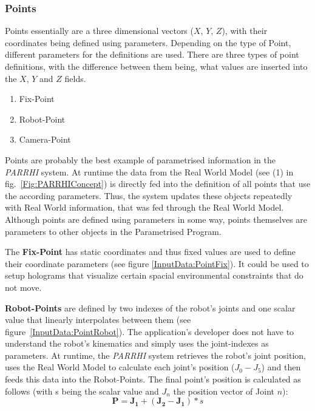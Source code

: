 \subsubsection{Points}\label{Section:Points}
 
Points essentially are a three dimensional vectors ($X$, $Y$, $Z$), with their coordinates being defined using parameters. Depending on the type of Point, different parameters for the definitions are used. There are three types of point definitions, with the difference between them being, what values are inserted into the $X$, $Y$ and $Z$ fields.
\begin{enumerate}
	\setlength\itemsep{-1em}
	\item Fix-Point
	\item Robot-Point
	\item Camera-Point
\end{enumerate}

Points are probably the best example of parametrised information in the \textit{PARRHI} system. At runtime the data from the Real World Model (see (1) in fig.~\ref{Fig:PARRHIConcept}) is directly fed into the definition of all points that use the according parameters. Thus, the system updates these objects repeatedly with Real World information, that was fed through the Real World Model. Although points are defined using parameters in some way, points themselves are parameters to other objects in the Parametrised Program.

The \textbf{Fix-Point} has static coordinates and thus fixed values are used to define their coordinate parameters (see figure \ref{InputData:PointFix}). It could be used to setup holograms that visualize certain spacial environmental constraints that do not move.

\textbf{Robot-Points} are defined by two indexes of the robot's joints and one scalar value that linearly interpolates between them (see figure~\ref{InputData:PointRobot}). The application's developer does not have to understand the robot's kinematics and simply uses the joint-indexes as parameters. At runtime, the \textit{PARRHI} system retrieves the robot's joint position, uses the Real World Model to calculate each joint's position ($J_0 - J_5$) and then feeds this data into the Robot-Points. The final point's position is calculated as follows (with s being the scalar value and $J_n$ the position vector of Joint $n$):
\begin{equation}
\boldsymbol{P} = \boldsymbol{J_1} + (\boldsymbol{J_2}-\boldsymbol{J_1}) * s
\end{equation}


